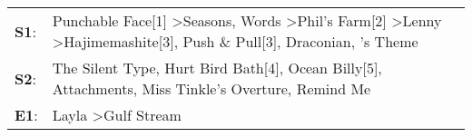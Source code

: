 \begin{supertabular}{p{0.03\textwidth}p{0.92\textwidth}}
 \textbf{S1}:  &  Punchable Face[1]\textsuperscript{} \textgreater \enspace Seasons\textsuperscript{}, \enspace Words\textsuperscript{} \textgreater \enspace Phil's Farm[2]\textsuperscript{} \textgreater \enspace Lenny\textsuperscript{} \textgreater \enspace Hajimemashite[3]\textsuperscript{}, \enspace Push \& Pull[3]\textsuperscript{}, \enspace Draconian\textsuperscript{}, 's Theme\textsuperscript{}  \enspace  \\
 \textbf{S2}:  &                                                                                                                                                   The Silent Type\textsuperscript{}, \enspace Hurt Bird Bath[4]\textsuperscript{}, \enspace Ocean Billy[5]\textsuperscript{}, \enspace Attachments\textsuperscript{}, \enspace Miss Tinkle's Overture\textsuperscript{}, \enspace Remind Me\textsuperscript{}  \enspace  \\
 \textbf{E1}:  &                                                                                                                                                                                                                                                                                                                                   Layla\textsuperscript{} \textgreater \enspace Gulf Stream\textsuperscript{}  \enspace  \\
\end{supertabular}
